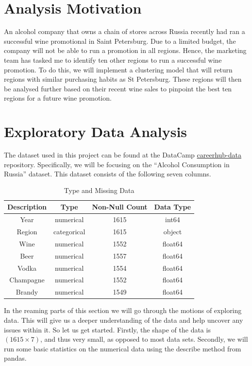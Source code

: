 \documentclass{article}
\begin{document}
\section{Analysis Motivation}
An alcohol company that owns a chain of stores across Russia recently had ran a successful wine promotional in Saint Petersburg. Due to a limited budget, the company will not be able to run a promotion in all regions. Hence, the marketing team has tasked me to identify ten other regions to run a successful wine promotion. To do this, we will implement a clustering model that will return regions with similar purchasing habits as St Petersburg. These regions will then be analysed further based on their recent wine sales to pinpoint the best ten regions for a future wine promotion.

\section{Exploratory Data Analysis}
The dataset used in this project can be found at the DataCamp \href{https://github.com/datacamp/careerhub-data}{careerhub-data} repository. Specifically, we will be focusing on the ``Alcohol Consumption in Russia'' dataset. This dataset consists of the following seven columns. 

\begin{table}[!htb]
    \centering
    \begin{tabular}{c|ccc}\hline
        Description & Type & Non-Null Count & Data Type\\ \hline
         Year &  numerical & 1615 & int64 \\
         Region & categorical & 1615 & object \\
         Wine & numerical& 1552  & float64\\
         Beer & numerical & 1557 & float64\\
         Vodka & numerical& 1554 & float64\\
         Champagne & numerical& 1552 & float64\\
         Brandy & numerical& 1549 & float64\\\hline
    \end{tabular}
    \caption{Type and Missing Data}
    \label{tab:data_type}
\end{table}


\noindent In the reaming parts of this section we will go through the motions of exploring data. This will give us a deeper understanding of the data and help uncover any issues within it. So let us get started. Firstly, the shape of the data is $(1615 \times 7)$, and thus very small, as opposed to most data sets. Secondly, we will run some basic statistics on the numerical data using the describe method from pandas.
\end{document}
